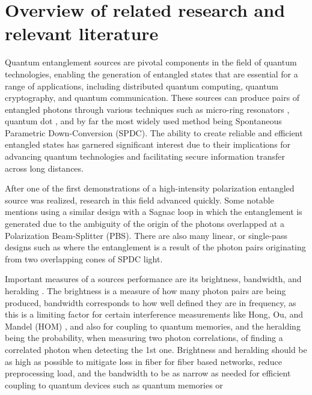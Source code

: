 \documentclass{article}
\begin{document}
\section{Overview of related research and relevant literature} Quantum
entanglement sources are pivotal components in the field of quantum
technologies, enabling the generation of entangled states that are essential
for a range of applications, including distributed quantum computing, quantum
cryptography, and quantum communication. These sources can produce pairs of
entangled photons through various techniques such as micro-ring resonators
\cite{Wakabayashi_2015}, quantum dot \cite{Rota_2024}, and by far the most
widely used method being Spontaneous Parametric Down-Conversion
\cite{jesseSPDC} (SPDC). The ability to create reliable and efficient entangled
states has garnered significant interest due to their implications for
advancing quantum technologies and facilitating secure information transfer
across long distances. \par After one of the first \cite{Kwiat_1995}
demonstrations of a high-intensity polarization entangled source was realized,
research in this field advanced quickly. Some notable mentions using a similar
design with a Sagnac loop
\cite{Neumann_Buchner_Bulla_Bohmann_Ursin_2022_CW,Chen_Ecker_Wengerowsky_Bulla_Joshi_Steinlechner_Ursin_2018_CW}
in which the entanglement is generated due to the ambiguity of the origin of
the photons overlapped at a Polarization Beam-Splitter (PBS). There are also
many linear, or single-pass designs such as \cite{Lee_Kim_Cha_Moon_2016} where
the entanglement is a result of the photon pairs originating from two
overlapping cones of SPDC light. \par Important measures of a sources
performance are its brightness, bandwidth, and heralding
\cite{Bennink_2010,Ljunggren_Tengner_Marsden_Pelton_2006}. The brightness is a
measure of how many photon pairs are being produced, bandwidth corresponds to
how well defined they are in frequency, as this is a limiting factor for
certain interference measurements like Hong, Ou, and Mandel (HOM)
\cite{Hong_Ou_Mandel_1987}, and also for coupling to quantum memories, and the
heralding being the probability, when measuring two photon correlations, of
finding a correlated photon when detecting the 1st one. Brightness and
heralding should be as high as possible to mitigate loss in fiber for fiber
based networks, reduce preprocessing load, and the bandwidth to be as narrow as
needed for efficient coupling to quantum devices such as quantum memories or
\end{document}

